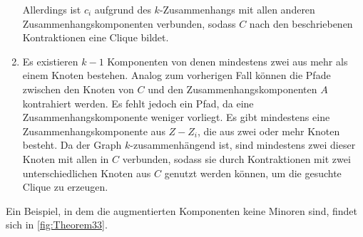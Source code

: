 \begin{beweis}
\begin{enumerate}
          Allerdings ist $c_i$ aufgrund des $k$-Zusammenhangs mit allen anderen Zusammenhangskomponenten verbunden, sodass $C$ nach den beschriebenen Kontraktionen eine Clique bildet.
    \item Es existieren $k-1$ Komponenten von denen mindestens zwei aus mehr als einem Knoten bestehen.
          Analog zum vorherigen Fall können die Pfade zwischen den Knoten von $C$ und den Zusammenhangskomponenten $A$ kontrahiert werden.
          Es fehlt jedoch ein Pfad, da eine Zusammenhangskomponente weniger vorliegt.
          Es gibt mindestens eine Zusammenhangskomponente aus $Z - Z_i$, die aus zwei oder mehr Knoten besteht.
          Da der Graph $k$-zusammenhängend ist, sind mindestens zwei dieser Knoten mit allen in $C$ verbunden, sodass sie durch Kontraktionen mit zwei unterschiedlichen Knoten aus $C$ genutzt werden können, um die gesuchte Clique zu erzeugen.
  \end{enumerate}
  Ein Beispiel, in dem die augmentierten Komponenten keine Minoren sind, findet sich in \Abb \ref{fig:Theorem33}.
\end{beweis}
